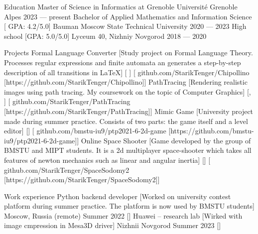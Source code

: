 \documentclass[
    compact
]{llresume}
\begin{document}
\makeheader

\begin{mainpane}
    \begin{mainsection}{Education}
		\entryJob
            {Master of Science in Informatics at Grenoble}
            {Université Grenoble Alpes}
            {2023 — present}
        \entryJob
            {Bachelor of Applied Mathematics and Information Science}
            [ GPA: 4.2/5.0]
            {Bauman Moscow State Technical University}
            {2020 — 2023}
        \entryJob
            {High school}
            [GPA: 5.0/5.0]
            {Lyceum 40, Nizhniy Novgorod}
            {2018 — 2020}
    \end{mainsection}


    \begin{mainsection}{Projects}
        \entryGeneric
            {Formal Language Converter}
            [Study project on Formal Language Theory. Processes regular expressions and finite automata an generates a step-by-step description of all transitions in LaTeX]
            [ ]
            [\infoGithub
                {github.com/StarikTenger/Chipollino}
                [https://github.com/StarikTenger/Chipollino]]
        \entryGeneric
            {PathTracing}
            [Rendering realistic images using path tracing. My coursework on the topic of Computer Graphics]
            [, ]
            [\infoGithub
                {github.com/StarikTenger/PathTracing}
                [https://github.com/StarikTenger/PathTracing]]
        \entryGeneric
            {Mimic Game}
            [University project made during summer practice. Consists of two parts: the game itself and a level editor]
            []
            [\infoGithub
                {github.com/bmstu-iu9/ptp2021-6-2d-game}
                [https://github.com/bmstu-iu9/ptp2021-6-2d-game]]
        \entryGeneric
            {Online Space Shooter}
            [Game developed by the group of BMSTU and MIPT students. It is a 2d multiplayer space-shooter which takes all features of newton mechanics such as linear and angular inertia]
            []
            [\infoGithub
                {github.com/StarikTenger/SpaceSodomy2}
                [https://github.com/StarikTenger/SpaceSodomy2]]
    \end{mainsection}

    \begin{mainsection}{Work experience}
        \entryJob
            {Python backend developer}
            [Worked on university contest platform during summer practice. The platform is now used by BMSTU students]
            {Moscow, Russia (remote)}
            {Summer 2022}
            []
		\entryJob
            {Huawei -- research lab}
            [Wirked with image cmpression in Mesa3D driver]
            {Nizhnii Novgorod}
            {Summer 2023}
            []
    \end{mainsection}


\end{mainpane}
\end{document}

